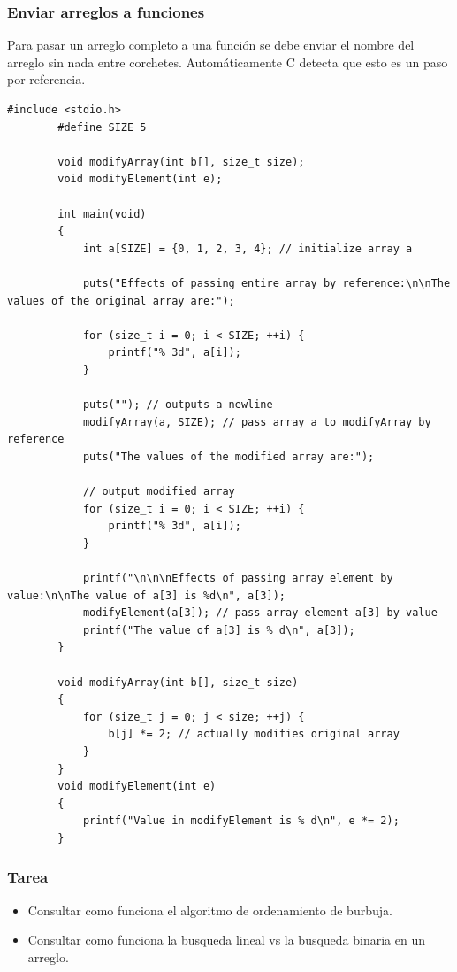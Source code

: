 \documentclass[10.5pt,scale=1.0,t,aspectratio=169,hyperref={pdfpagelabels=false}]{beamer}
\begin{document}
\begin{frame}[fragile]
	\frametitle{Enviar arreglos a funciones} 
	Para pasar un arreglo completo a una función se debe enviar el nombre del arreglo sin nada entre corchetes. Automáticamente C detecta que esto es un paso por referencia.
	\begin{multicols}{2} 
	\begin{lstlisting}[style=CStyle]
		#include <stdio.h>
		#define SIZE 5
		
		void modifyArray(int b[], size_t size);
		void modifyElement(int e);
		
		int main(void)
		{
			int a[SIZE] = {0, 1, 2, 3, 4}; // initialize array a
			
			puts("Effects of passing entire array by reference:\n\nThe values of the original array are:");
			
			for (size_t i = 0; i < SIZE; ++i) {
				printf("% 3d", a[i]);
			}
			
			puts(""); // outputs a newline
			modifyArray(a, SIZE); // pass array a to modifyArray by reference
			puts("The values of the modified array are:");
			
			// output modified array
			for (size_t i = 0; i < SIZE; ++i) {
				printf("% 3d", a[i]);
			}
			
			printf("\n\n\nEffects of passing array element by value:\n\nThe value of a[3] is %d\n", a[3]);
			modifyElement(a[3]); // pass array element a[3] by value
			printf("The value of a[3] is % d\n", a[3]);
		}
		
		void modifyArray(int b[], size_t size)
		{
			for (size_t j = 0; j < size; ++j) {
				b[j] *= 2; // actually modifies original array
			}
		}
		void modifyElement(int e)
		{
			printf("Value in modifyElement is % d\n", e *= 2);
		}
	\end{lstlisting}
\end{multicols}
\end{frame}
\begin{frame}
	\frametitle{Tarea} 
	\begin{itemize}
		\item Consultar como funciona el algoritmo de ordenamiento de burbuja.
		\item Consultar como funciona la busqueda lineal vs la busqueda binaria en un arreglo.
	\end{itemize}
\end{frame}
\end{document}
